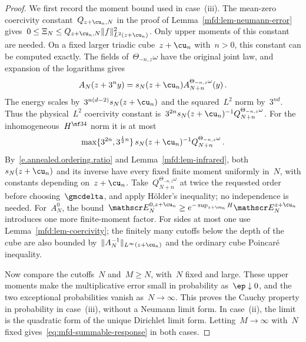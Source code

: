 \documentclass[11pt]{amsart}
\begin{document}
\begin{proof}
We first record the moment bound used in case~(iii). The mean-zero coercivity constant~$Q_{z+\cu_n,N}$ in the proof of Lemma~\ref{mfd:lem-neumann-error} gives~$0\leq \Xi_N\leq Q_{z+\cu_n,N}\|f\|_{L^2(z+\cu_n)}^2$. Only upper moments of this constant are needed. On a fixed larger triadic cube~$z+\cu_n$ with~$n>0$, this constant can be computed exactly. The fields of~$\Theta_{-n,z}\omega$ have the original joint law, and expansion of the logarithms gives
\begin{equation*}
	A_N(z+3^ny)=s_N(z+\cu_n)A_{N+n}^{\Theta_{-n,z}\omega}(y)\,.
\end{equation*}
The energy scales by~$3^{n(d-2)}s_N(z+\cu_n)$ and the squared~$L^2$ norm by~$3^{nd}$. Thus the physical~$L^2$ coercivity constant is~$3^{2n}s_N(z+\cu_n)^{-1}Q_{N+n}^{\Theta_{-n,z}\omega}$. For the inhomogeneous~$H^{\nf34}$ norm it is at most
\begin{equation*}
	\max\{3^{2n},3^{\frac12n}\}\,s_N(z+\cu_n)^{-1}Q_{N+n}^{\Theta_{-n,z}\omega}\,.
\end{equation*}
By~\eqref{e.annealed.ordering.ratio} and Lemma~\ref{mfd:lem-infrared}, both~$s_N(z+\cu_n)$ and its inverse have every fixed finite moment uniformly in~$N$, with constants depending on~$z+\cu_n$. Take~$Q_{N+n}^{\Theta_{-n,z}\omega}$ at twice the requested order before choosing~$\gmcdelta$, and apply H\"older's inequality; no independence is needed. For~$A_N^0$, the bound~$\mathscr E_N^{0,z+\cu_n}\geq e^{-\sup_{z+\cu_n}H}\mathscr E_N^{z+\cu_n}$ introduces one more finite-moment factor. For sides at most one use Lemma~\ref{mfd:lem-coercivity}; the finitely many cutoffs below the depth of the cube are also bounded by~$\|A_N^{-1}\|_{L^\infty(z+\cu_n)}$ and the ordinary cube Poincar\'e inequality.

\smallskip

Now compare the cutoffs~$N$ and~$M\geq N$, with~$N$ fixed and large. These upper moments make the multiplicative error small in probability as~$\ep\downarrow0$, and the two exceptional probabilities vanish as~$N\to\infty$. This proves the Cauchy property in probability in case~(iii), without a Neumann limit form. In case~(ii), the limit is the quadratic form of the unique Dirichlet limit form. Letting~$M\to\infty$ with~$N$ fixed gives~\eqref{eq:mfd-summable-response} in both cases.

\smallskip


\end{proof}
\end{document}
